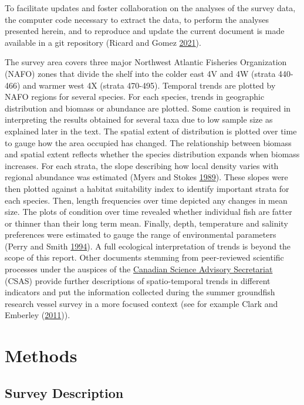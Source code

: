 \documentclass[12pt]{article}\usepackage[]{graphicx}\usepackage[]{color}
\begin{document}
To facilitate updates and foster collaboration on the analyses of the survey data, the computer code necessary to extract the data, to perform the analyses presented herein, and to reproduce and update the current document is made available in a git repository (Ricard and Gomez \protect\hyperlink{ref-Ricard-Gomez-2021}{2021}).

The survey area covers three major Northwest Atlantic Fisheries Organization (NAFO) zones that divide the shelf into the colder east 4V and 4W (strata 440-466) and warmer west 4X (strata 470-495). Temporal trends are plotted by NAFO regions for several species. For each species, trends in geographic distribution and biomass or abundance are plotted. Some caution is required in interpreting the results obtained for several taxa due to low sample size as explained later in the text. The spatial extent of distribution is plotted over time to gauge how the area occupied has changed. The relationship between biomass and spatial extent reflects whether the species distribution expands when biomass increases. For each strata, the slope describing how local density varies with regional abundance was estimated (Myers and Stokes \protect\hyperlink{ref-Myers:Stokes:1989}{1989}). These slopes were then plotted against a habitat suitability index to identify important strata for each species. Then, length frequencies over time depicted any changes in mean size. The plots of condition over time revealed whether individual fish are fatter or thinner than their long term mean. Finally, depth, temperature and salinity preferences were estimated to gauge the range of environmental parameters (Perry and Smith \protect\hyperlink{ref-Perry:Smith:1994:cjfas}{1994}). A full ecological interpretation of trends is beyond the scope of this report. Other documents stemming from peer-reviewed scientific processes under the auspices of the \href{https://www.dfo-mpo.gc.ca/csas-sccs/}{Canadian Science Advisory Secretariat} (CSAS) provide further descriptions of spatio-temporal trends in different indicators and put the information collected during the summer groundfish research vessel survey in a more focused context (see for example Clark and Emberley (\protect\hyperlink{ref-ClarkEmberley2011}{2011})).

\hypertarget{methods}{%
\section{Methods}\label{methods}}

\hypertarget{survey-description}{%
\subsection{Survey Description}\label{survey-description}}
\end{document}
